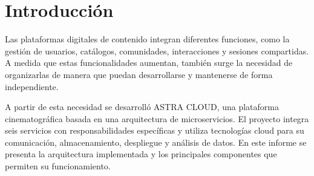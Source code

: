 ﻿\chapter{Introducción}
Las plataformas digitales de contenido integran diferentes funciones, como la gestión de usuarios, catálogos, comunidades, interacciones y sesiones compartidas. A medida que estas funcionalidades aumentan, también surge la necesidad de organizarlas de manera que puedan desarrollarse y mantenerse de forma independiente.

A partir de esta necesidad se desarrolló ASTRA CLOUD, una plataforma cinematográfica basada en una arquitectura de microservicios. El proyecto integra seis servicios con responsabilidades específicas y utiliza tecnologías cloud para su comunicación, almacenamiento, despliegue y análisis de datos. En este informe se presenta la arquitectura implementada y los principales componentes que permiten su funcionamiento.
